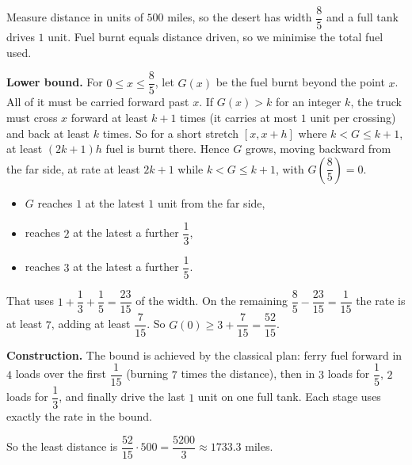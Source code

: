 Measure distance in units of $500$ miles, so the desert has width $\dfrac85$ and a full tank drives $1$ unit. Fuel burnt equals distance driven, so we minimise the total fuel used.

\textbf{Lower bound.} For $0\le x\le\dfrac85$, let $G(x)$ be the fuel burnt beyond the point $x$. All of it must be carried forward past $x$. If $G(x)>k$ for an integer $k$, the truck must cross $x$ forward at least $k+1$ times (it carries at most $1$ unit per crossing) and back at least $k$ times. So for a short stretch $[x,x+h]$ where $k<G\le k+1$, at least $(2k+1)h$ fuel is burnt there. Hence $G$ grows, moving backward from the far side, at rate at least $2k+1$ while $k<G\le k+1$, with $G\left(\dfrac85\right)=0$.
\begin{itemize}
\item $G$ reaches $1$ at the latest $1$ unit from the far side,
\item reaches $2$ at the latest a further $\dfrac13$,
\item reaches $3$ at the latest a further $\dfrac15$.
\end{itemize}
That uses $1+\dfrac13+\dfrac15=\dfrac{23}{15}$ of the width. On the remaining $\dfrac85-\dfrac{23}{15}=\dfrac1{15}$ the rate is at least $7$, adding at least $\dfrac7{15}$. So $G(0)\ge3+\dfrac7{15}=\dfrac{52}{15}$.

\textbf{Construction.} The bound is achieved by the classical plan: ferry fuel forward in $4$ loads over the first $\dfrac1{15}$ (burning $7$ times the distance), then in $3$ loads for $\dfrac15$, $2$ loads for $\dfrac13$, and finally drive the last $1$ unit on one full tank. Each stage uses exactly the rate in the bound.

So the least distance is $\dfrac{52}{15}\cdot500=\boxed{\dfrac{5200}{3}\approx1733.3}$ miles.
